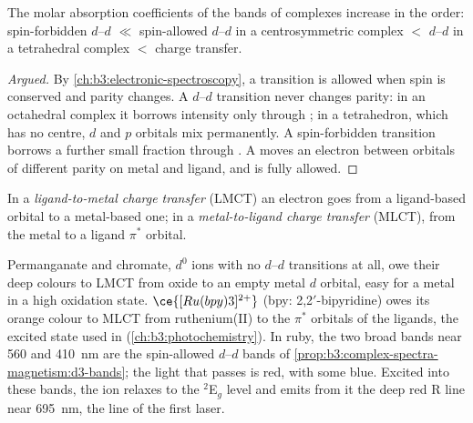 \begin{proposition}\label{prop:b3:complex-spectra-magnetism:intensity-order}
The molar absorption coefficients of the bands of complexes increase in the
order: spin-forbidden $d$--$d$ $\ll$ spin-allowed $d$--$d$ in a centrosymmetric complex $<$ $d$--$d$
in a tetrahedral complex $<$ charge transfer.
\end{proposition}

\begin{proof}[Argued]
By \cref{ch:b3:electronic-spectroscopy}, a transition is allowed when spin is
conserved and parity changes. A $d$--$d$ transition never changes parity: in an
octahedral complex it borrows intensity only through ; in a
tetrahedron, which has no centre, $d$ and $p$ orbitals mix permanently. A
spin-forbidden transition borrows a further small fraction through . A  moves an electron between orbitals of
different parity on metal and ligand, and is fully allowed.
\end{proof}

\begin{definition}\label{def:b3:complex-spectra-magnetism:ct}
In a \emph{ligand-to-metal charge transfer} (LMCT) an electron goes from a ligand-based orbital to a metal-based
one; in a \emph{metal-to-ligand charge transfer} (MLCT), from the metal to a ligand $\pi^*$ orbital.
\end{definition}

Permanganate and chromate, $d^0$ ions with no $d$--$d$ transitions at all, owe their deep
colours to LMCT from oxide to an empty metal $d$ orbital, easy for a metal in a high
oxidation state. $\ce{[Ru(bpy)3]^{2+}}$ (bpy: 2,2$'$-bipyridine) owes its orange colour to MLCT
from ruthenium(II) to the $\pi^*$ orbitals of the ligands, the excited state used in
 (\cref{ch:b3:photochemistry}). In ruby, the two broad bands
near 560 and \qty{410}{nm} are the spin-allowed $d$--$d$ bands of
\cref{prop:b3:complex-spectra-magnetism:d3-bands}; the light that passes is red,
with some blue. Excited into these bands, the ion relaxes to the $^2$E$_g$ level and
emits from it the deep red R line near \qty{695}{nm}, the line of the first laser.

